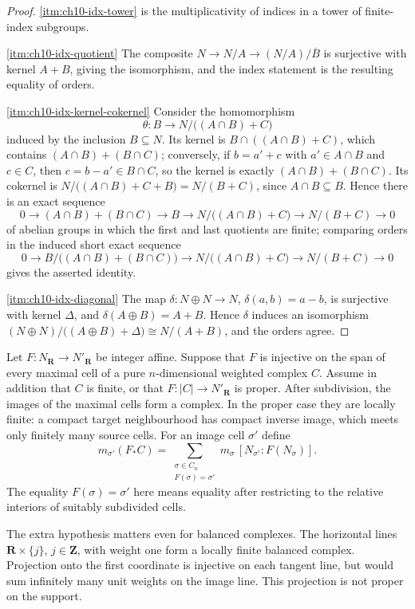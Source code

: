\begin{proof}
\cref{itm:ch10-idx-tower} is the multiplicativity of indices in a tower of
finite-index subgroups.

\cref{itm:ch10-idx-quotient} The composite $N\to N/A\to(N/A)/\overline B$ is
surjective with kernel $A+B$, giving the isomorphism, and the index
statement is the resulting equality of orders.

\cref{itm:ch10-idx-kernel-cokernel} Consider the homomorphism
\[
 \theta:B\longrightarrow N/\bigl((A\cap B)+C\bigr)
\]
induced by the inclusion $B\subseteq N$.  Its kernel is
$B\cap((A\cap B)+C)$, which contains $(A\cap B)+(B\cap C)$; conversely, if
$b=a'+c$ with $a'\in A\cap B$ and $c\in C$, then $c=b-a'\in B\cap C$, so the
kernel is exactly $(A\cap B)+(B\cap C)$.  Its cokernel is
$N/\bigl((A\cap B)+C+B\bigr)=N/(B+C)$, since $A\cap B\subseteq B$.  Hence
there is an exact sequence
\[
 0\to(A\cap B)+(B\cap C)\to B\to N/\bigl((A\cap B)+C\bigr)\to N/(B+C)\to0
\]
of abelian groups in which the first and last quotients are finite; comparing
orders in the induced short exact sequence
\[
 0\to B/\bigl((A\cap B)+(B\cap C)\bigr)\to
 N/\bigl((A\cap B)+C\bigr)\to N/(B+C)\to0
\]
gives the asserted identity.

\cref{itm:ch10-idx-diagonal} The map $\delta:N\oplus N\to N$,
$\delta(a,b)=a-b$, is surjective with kernel $\Delta$, and
$\delta(A\oplus B)=A+B$.  Hence $\delta$ induces an isomorphism
$(N\oplus N)/\bigl((A\oplus B)+\Delta\bigr)\cong N/(A+B)$, and the orders
agree.
\end{proof}

Let $F:N_{\mathbf R}\to N'_{\mathbf R}$ be integer affine.  Suppose that
$F$ is injective on the span of every maximal cell of a pure
$n$-dimensional weighted complex $C$. Assume in addition that $C$ is finite,
or that $F:|C|\to N'_{\mathbf R}$ is proper. After subdivision, the images
of the maximal cells form a complex. In the proper case they are locally
finite: a compact target neighbourhood has compact inverse image, which
meets only finitely many source cells. For an image cell $\sigma'$ define
\[
 m_{\sigma'}(F_*C)
 =\sum_{\substack{\sigma\in C_n\\F(\sigma)=\sigma'}}
   m_\sigma\,[N_{\sigma'}:F(N_\sigma)].
\]
The equality $F(\sigma)=\sigma'$ here means equality after restricting to the
relative interiors of suitably subdivided cells.

The extra hypothesis matters even for balanced complexes. The horizontal
lines $\mathbf R\times\{j\}$, $j\in\mathbf Z$, with weight one form a
locally finite balanced complex. Projection onto the first coordinate is
injective on each tangent line, but would sum infinitely many unit weights
on the image line. This projection is not proper on the support.

